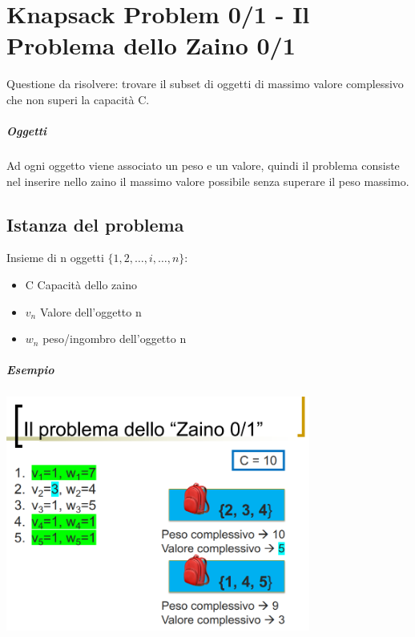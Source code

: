 \chapter{Knapsack Problem 0/1 - Il Problema dello Zaino 0/1}
Questione da risolvere: trovare il subset di oggetti di massimo valore complessivo
che non superi la capacità C.
\paragraph*{Oggetti} Ad ogni oggetto viene associato un peso e un valore, quindi il problema
consiste nel inserire nello zaino il massimo valore possibile senza superare il peso massimo.
\section{Istanza del problema}
Insieme di n oggetti $\{1,2,\dots,i,\dots,n\}$:
\begin{itemize}
    \item C \ra Capacità dello zaino
    \item $v_n$ \ra Valore dell'oggetto n
    \item $w_n$ \ra peso/ingombro dell'oggetto n
\end{itemize}
\paragraph*{Esempio}
\begin{center}
    \includegraphics[width=100mm, scale=0.5]{chapters_ulerich/img/knapsack_example.png}
\end{center}

